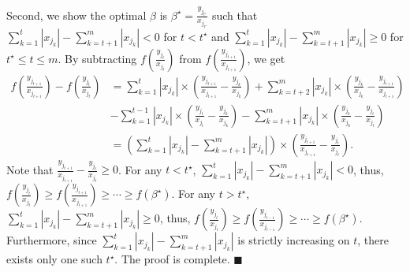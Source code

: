 \documentclass[12pt]{article}
\newcommand*{\QEDA}{\hfill\ensuremath{\blacksquare}}%
\begin{document}
Second, we show the optimal $\beta$ is $\beta^{\star} = \frac{y_{{j}_{t^{\star}}}}{x_{{j}_{t^{\star}}}}$ such that $\sum_{k = 1}^t \left|x_{{j}_k}\right| - \sum_{k = t + 1}^m \left|x_{{j}_k}\right| < 0$ for $t < t^{\star}$ and $\sum_{k = 1}^t \left|x_{{j}_k}\right| - \sum_{k = t + 1}^m \left|x_{{j}_k}\right| \geq 0$ for $t^{\star} \leq t \leq m$. By subtracting $f\left(\frac{y_{{j}_{t}}}{x_{{j}_{t}}}\right)$ from $f\left(\frac{y_{{j}_{t + 1}}}{x_{{j}_{t + 1}}}\right)$, we get
\begin{align}
f\left(\frac{y_{ {j}_{t + 1}}}{x_{ {j}_{t + 1}}}\right) - f\left(\frac{y_{ {j}_{t}}}{x_{ {j}_{t}}}\right)
& = \sum_{k = 1}^{t} \left|x_{ {j}_k}\right|\times\left(\frac{y_{ {j}_{t + 1}}}{x_{ {j}_{t + 1}}} - \frac{y_{ {j}_k}}{x_{ {j}_k}}\right)
 + \sum_{k = t + 2}^m \left|x_{ {j}_k}\right|\times\left(\frac{y_{ {j}_k}}{x_{ {j}_k}} - \frac{y_{ {j}_{t + 1}}}{x_{ {j}_{t + 1}}}\right) \nonumber\\
 & - \sum_{k = 1}^{t - 1} \left|x_{ {j}_k}\right|\times\left(\frac{y_{ {j}_{t}}}{x_{ {j}_{t}}} - \frac{y_{ {j}_k}}{x_{ {j}_k}}\right)
 - \sum_{k = t + 1}^m \left|x_{ {j}_k}\right|\times\left(\frac{y_{ {j}_k}}{x_{ {j}_k}} - \frac{y_{ {j}_{t}}}{x_{ {j}_{t}}}\right) \nonumber\\
 & = \left(\sum_{k = 1}^{t} \left|x_{ {j}_k}\right| - \sum_{k = t + 1}^{m} \left|x_{ {j}_k}\right|\right)\times\left(\frac{y_{ {j}_{t + 1}}}{x_{ {j}_{t + 1}}} - \frac{y_{ {j}_t}}{x_{ {j}_t}}\right).\nonumber
\end{align}
Note that $\frac{y_{ {j}_{t + 1}}}{x_{ {j}_{t + 1}}} - \frac{y_{ {j}_t}}{x_{ {j}_t}} \geq 0$. For any $t < t^{\star}$, $\sum_{k = 1}^t \left|x_{ {j}_k}\right| - \sum_{k = t + 1}^m \left|x_{ {j}_k}\right| < 0$, thus, $f\left(\frac{y_{ {j}_{t}}}{x_{ {j}_{t}}}\right) \geq f\left(\frac{y_{ {j}_{t + 1}}}{x_{ {j}_{t + 1}}}\right) \geq \cdots \geq f(\beta^{\star})$. For any $t > t^{\star}$, $\sum_{k = 1}^t \left|x_{ {j}_k}\right| - \sum_{k = t + 1}^m \left|x_{ {j}_k}\right| \geq 0$, thus, $f\left(\frac{y_{ {j}_{t}}}{x_{ {j}_{t}}}\right) \geq f\left(\frac{y_{ {j}_{t - 1}}}{x_{ {j}_{t - 1}}}\right) \geq \cdots \geq f(\beta^{\star})$. Furthermore, since $\sum_{k = 1}^{t} \left|x_{ {j}_k}\right| - \sum_{k = t + 1}^{m} \left|x_{ {j}_k}\right|$ is strictly increasing on $t$, there exists only one such $t^{\star}$. The proof is complete.
\hfill \QEDA


%
%
\end{document}
